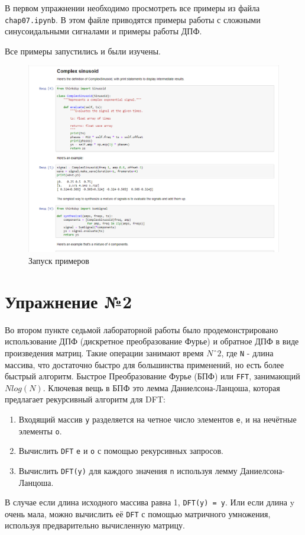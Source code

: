\documentclass[a4paper, 14pt]{extarticle}
\begin{document}
    В первом упражнении необходимо просмотреть все примеры из файла \texttt{chap07.ipynb}.
    В этом файле приводятся примеры работы с сложными синусоидальными сигналами и примеры работы ДПФ.

    Все примеры запустились и были изучены.

    \begin{figure}[H]
        \centering
        \includegraphics[width=0.8\linewidth]{check_work}
        \caption{Запуск примеров}
        \label{fig:check_work}
    \end{figure}

    \newpage


    \section{Упражнение №2}
    \label{sec:2}

    Во втором пункте седьмой лабораторной работы было продемонстрировано использование ДПФ (дискретное преобразование Фурье) и обратное ДПФ в виде произведения матриц.
    Такие операции занимают время \texttt{\(Nˆ2\)}, где \texttt{N} - длина массива, что достаточно быстро для большинства применений, но есть более быстрый алгоритм.
    Быстрое Преобразование Фурье (БПФ) или \texttt{FFT}, занимающий \texttt{\(Nlog(N)\)}.
    Ключевая вещь в БПФ это лемма Даниелсона-Ланцоша, которая предлагает рекурсивный алгоритм для DFT:
    \begin{enumerate}
        \item Входящий массив \texttt{y} разделяется на четное число элементов \texttt{e}, и на нечётные элементы \texttt{o}.
        \item Вычислить \texttt{DFT} \texttt{e} и \texttt{o} с помощью рекурсивных запросов.
        \item Вычислить \texttt{DFT(y)} для каждого значения \texttt{n} используя лемму Даниелсона-Ланцоша.
    \end{enumerate}
    В случае если длина исходного массива равна 1, \texttt{DFT(y) = y}.
    Или если длина y очень мала, можно вычислить её \texttt{DFT} с помощью матричного умножения, используя предварительно вычисленную матрицу.
\end{document}
